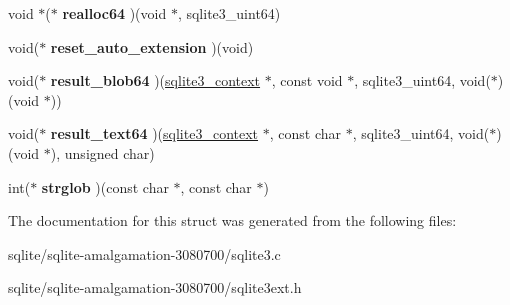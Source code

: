\begin{DoxyCompactItemize}
\item 
\hypertarget{structsqlite3__api__routines_a70ff502fb988ab59ef938e1d490ee421}{void $\ast$($\ast$ {\bfseries realloc64} )(void $\ast$, sqlite3\+\_\+uint64)}\label{structsqlite3__api__routines_a70ff502fb988ab59ef938e1d490ee421}

\item 
\hypertarget{structsqlite3__api__routines_a4b6b665952a3dfdf31bc6dc227353617}{void($\ast$ {\bfseries reset\+\_\+auto\+\_\+extension} )(void)}\label{structsqlite3__api__routines_a4b6b665952a3dfdf31bc6dc227353617}

\item 
\hypertarget{structsqlite3__api__routines_a1a122d054b1085e09d7c99db0fbf33d7}{void($\ast$ {\bfseries result\+\_\+blob64} )(\hyperlink{structsqlite3__context}{sqlite3\+\_\+context} $\ast$, const void $\ast$, sqlite3\+\_\+uint64, void($\ast$)(void $\ast$))}\label{structsqlite3__api__routines_a1a122d054b1085e09d7c99db0fbf33d7}

\item 
\hypertarget{structsqlite3__api__routines_aa731fddf6223075f2c988a61db715908}{void($\ast$ {\bfseries result\+\_\+text64} )(\hyperlink{structsqlite3__context}{sqlite3\+\_\+context} $\ast$, const char $\ast$, sqlite3\+\_\+uint64, void($\ast$)(void $\ast$), unsigned char)}\label{structsqlite3__api__routines_aa731fddf6223075f2c988a61db715908}

\item 
\hypertarget{structsqlite3__api__routines_a5768d018c3bc78c1e7017aa350473891}{int($\ast$ {\bfseries strglob} )(const char $\ast$, const char $\ast$)}\label{structsqlite3__api__routines_a5768d018c3bc78c1e7017aa350473891}

\end{DoxyCompactItemize}


The documentation for this struct was generated from the following files\+:\begin{DoxyCompactItemize}
\item 
sqlite/sqlite-\/amalgamation-\/3080700/sqlite3.\+c\item 
sqlite/sqlite-\/amalgamation-\/3080700/sqlite3ext.\+h\end{DoxyCompactItemize}
